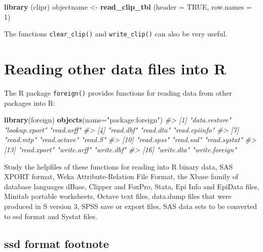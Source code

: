 \documentclass[
]{book}
\newenvironment{Shaded}{\begin{snugshade}}{\end{snugshade}}
\newcommand{\AttributeTok}[1]{\textcolor[rgb]{0.13,0.29,0.53}{#1}}
\newcommand{\CommentTok}[1]{\textcolor[rgb]{0.56,0.35,0.01}{\textit{#1}}}
\newcommand{\ConstantTok}[1]{\textcolor[rgb]{0.56,0.35,0.01}{#1}}
\newcommand{\DecValTok}[1]{\textcolor[rgb]{0.00,0.00,0.81}{#1}}
\newcommand{\FunctionTok}[1]{\textcolor[rgb]{0.13,0.29,0.53}{\textbf{#1}}}
\newcommand{\NormalTok}[1]{#1}
\newcommand{\OtherTok}[1]{\textcolor[rgb]{0.56,0.35,0.01}{#1}}
\newcommand{\StringTok}[1]{\textcolor[rgb]{0.31,0.60,0.02}{#1}}
\begin{document}
\begin{Shaded}
\begin{Highlighting}[]
\FunctionTok{library}\NormalTok{ (clipr)}
\NormalTok{objectname }\OtherTok{\textless{}{-}} \FunctionTok{read\_clip\_tbl}\NormalTok{ (}\AttributeTok{header =} \ConstantTok{TRUE}\NormalTok{, }\AttributeTok{row.names =} \DecValTok{1}\NormalTok{)}
\end{Highlighting}
\end{Shaded}

The functions \texttt{clear\_clip()} and \texttt{write\_clip()} can also be very useful.

\section{Reading other data files into R}\label{reading-other-data-files-into-r}

The R package \texttt{foreign()} provides functions for reading data from other packages into R:

\begin{Shaded}
\begin{Highlighting}[]
\FunctionTok{library}\NormalTok{(foreign)}
\FunctionTok{objects}\NormalTok{(}\AttributeTok{name=}\StringTok{"package:foreign"}\NormalTok{)}
\CommentTok{\#\textgreater{}  [1] "data.restore"  "lookup.xport"  "read.arff"    }
\CommentTok{\#\textgreater{}  [4] "read.dbf"      "read.dta"      "read.epiinfo" }
\CommentTok{\#\textgreater{}  [7] "read.mtp"      "read.octave"   "read.S"       }
\CommentTok{\#\textgreater{} [10] "read.spss"     "read.ssd"      "read.systat"  }
\CommentTok{\#\textgreater{} [13] "read.xport"    "write.arff"    "write.dbf"    }
\CommentTok{\#\textgreater{} [16] "write.dta"     "write.foreign"}
\end{Highlighting}
\end{Shaded}

Study the helpfiles of these functions for reading into R binary data, SAS XPORT format, Weka Attribute-Relation File Format, the Xbase family of database languages dBase, Clipper and FoxPro, Stata, Epi Info and EpiData files, Minitab portable worksheets, Octave text files, data.dump files that were produced in S version 3, SPSS save or export files, SAS data sets to be converted to ssd format and Systat files.

\subsection{ssd format footnote}\label{ssd-format-footnote}
\end{document}

